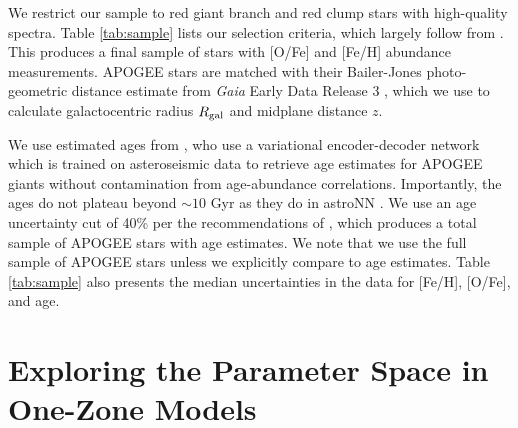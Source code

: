 \documentclass[twocolumn,twocolappendix,linenumbers]{aastex631}
\begin{document}
We restrict our sample to red giant branch and red clump stars with high-quality spectra. Table \ref{tab:sample} lists our selection criteria, which largely follow from \citet{Hayden2015-ChemicalCartography}. This produces a final sample of stars with [O/Fe] and [Fe/H] abundance measurements. APOGEE stars are matched with their Bailer-Jones photo-geometric distance estimate from \textit{Gaia} Early Data Release 3 \citep{gaia_collaboration_gaia_2016,gaia_collaboration_gaia_2021}, which we use to calculate galactocentric radius $R_{\rm gal}$ and midplane distance $z$.

We use estimated ages from \citet[][hereafter ]{leung_variational_2023}, who use a variational encoder-decoder network which is trained on asteroseismic data to retrieve age estimates for APOGEE giants without contamination from age-abundance correlations. Importantly, the  ages do not plateau beyond $\sim10$ Gyr as they do in astroNN \citep{Mackereth2019-astroNN-Ages}. We use an age uncertainty cut of 40\% per the recommendations of , which produces a total sample of APOGEE stars with age estimates. We note that we use the full sample of APOGEE stars unless we explicitly compare to age estimates. Table \ref{tab:sample} also presents the median uncertainties in the data for [Fe/H], [O/Fe], and age.

\section{Exploring the Parameter Space in One-Zone Models}
\label{sec:onezone-results}
\end{document}
